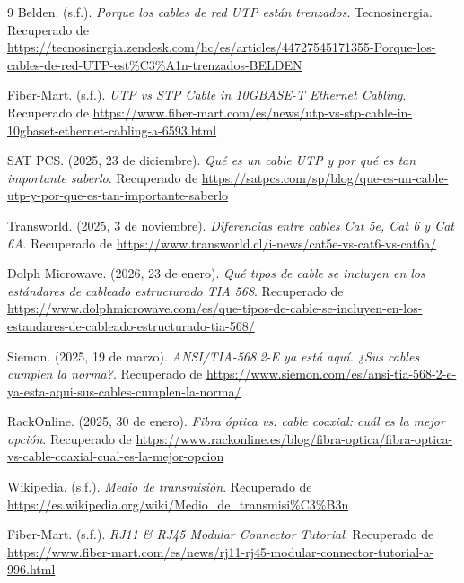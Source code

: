 \documentclass[a4paper,12pt]{article}
\begin{document}
\begin{thebibliography}{9}
    Belden. (s.f.). \textit{Porque los cables de red UTP están trenzados}. Tecnosinergia. Recuperado de \url{https://tecnosinergia.zendesk.com/hc/es/articles/44727545171355-Porque-los-cables-de-red-UTP-est%C3%A1n-trenzados-BELDEN}

    Fiber-Mart. (s.f.). \textit{UTP vs STP Cable in 10GBASE-T Ethernet Cabling}. Recuperado de \url{https://www.fiber-mart.com/es/news/utp-vs-stp-cable-in-10gbaset-ethernet-cabling-a-6593.html}

    SAT PCS. (2025, 23 de diciembre). \textit{Qué es un cable UTP y por qué es tan importante saberlo}. Recuperado de \url{https://satpcs.com/sp/blog/que-es-un-cable-utp-y-por-que-es-tan-importante-saberlo}

    Transworld. (2025, 3 de noviembre). \textit{Diferencias entre cables Cat 5e, Cat 6 y Cat 6A}. Recuperado de \url{https://www.transworld.cl/i-news/cat5e-vs-cat6-vs-cat6a/}

    Dolph Microwave. (2026, 23 de enero). \textit{Qué tipos de cable se incluyen en los estándares de cableado estructurado TIA 568}. Recuperado de \url{https://www.dolphmicrowave.com/es/que-tipos-de-cable-se-incluyen-en-los-estandares-de-cableado-estructurado-tia-568/}

    Siemon. (2025, 19 de marzo). \textit{ANSI/TIA-568.2-E ya está aquí. ¿Sus cables cumplen la norma?}. Recuperado de \url{https://www.siemon.com/es/ansi-tia-568-2-e-ya-esta-aqui-sus-cables-cumplen-la-norma/}

    RackOnline. (2025, 30 de enero). \textit{Fibra óptica vs. cable coaxial: cuál es la mejor opción}. Recuperado de \url{https://www.rackonline.es/blog/fibra-optica/fibra-optica-vs-cable-coaxial-cual-es-la-mejor-opcion}

    Wikipedia. (s.f.). \textit{Medio de transmisión}. Recuperado de \url{https://es.wikipedia.org/wiki/Medio_de_transmisi%C3%B3n}

    Fiber-Mart. (s.f.). \textit{RJ11 \& RJ45 Modular Connector Tutorial}. Recuperado de \url{https://www.fiber-mart.com/es/news/rj11-rj45-modular-connector-tutorial-a-996.html}


\end{thebibliography}
\end{document}
